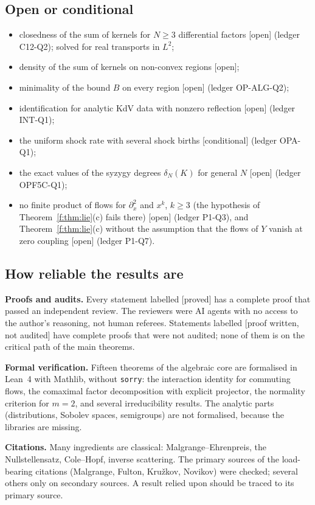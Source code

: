 \documentclass[11pt]{article}
\theoremstyle{plain}
\theoremstyle{definition}
\theoremstyle{remark}
\newcommand{\badge}[2]{\textcolor{#1}{\textsf{\footnotesize[#2]}}}
\newcommand{\proved}[1][]{\badge{cC}{proved#1}}
\newcommand{\condl}{\badge{cD}{conditional}}
\newcommand{\openq}{\badge{cB}{open}}
\newcommand{\led}[1]{\textcolor{cG}{\textsf{\footnotesize(ledger #1)}}}
\newcommand{\pw}{\badge{cD}{proof written, not audited}}
\begin{document}
\subsection{Open or conditional}

\begin{itemize}
\item closedness of the sum of kernels for $N\ge3$ differential factors \openq{} \led{C12-Q2}; solved for real transports in $L^2$;
\item density of the sum of kernels on non-convex regions \openq;
\item minimality of the bound $B$ on every region \openq{} \led{OP-ALG-Q2};
\item identification for analytic KdV data with nonzero reflection \openq{} \led{INT-Q1};
\item the uniform shock rate with several shock births \condl{} \led{OPA-Q1};
\item the exact values of the syzygy degrees $\delta_N(K)$ for general $N$ \openq{} \led{OPF5C-Q1};
\item no finite product of flows for $\partial_x^2$ and $x^k$, $k\ge3$ (the hypothesis of Theorem~\ref{f:thm:lie}(c) fails there) \openq{} \led{P1-Q3}, and Theorem~\ref{f:thm:lie}(c) without the assumption that the flows of $Y$ vanish at zero coupling \openq{} \led{P1-Q7}.
\end{itemize}

\subsection{How reliable the results are}

\textbf{Proofs and audits.} Every statement labelled \proved{} has a complete proof that passed an independent review. The reviewers were AI agents with no access to the author's reasoning, not human referees. Statements labelled \pw{} have complete proofs that were not audited; none of them is on the critical path of the main theorems.

\textbf{Formal verification.} Fifteen theorems of the algebraic core are formalised in Lean~4 with Mathlib, without \texttt{sorry}: the interaction identity for commuting flows, the comaximal factor decomposition with explicit projector, the normality criterion for $m=2$, and several irreducibility results. The analytic parts (distributions, Sobolev spaces, semigroups) are not formalised, because the libraries are missing.

\textbf{Citations.} Many ingredients are classical: Malgrange--Ehrenpreis, the Nullstellensatz, Cole--Hopf, inverse scattering. The primary sources of the load-bearing citations (Malgrange, Fulton, Kru\v zkov, Novikov) were checked; several others only on secondary sources. A result relied upon should be traced to its primary source.
\end{document}
